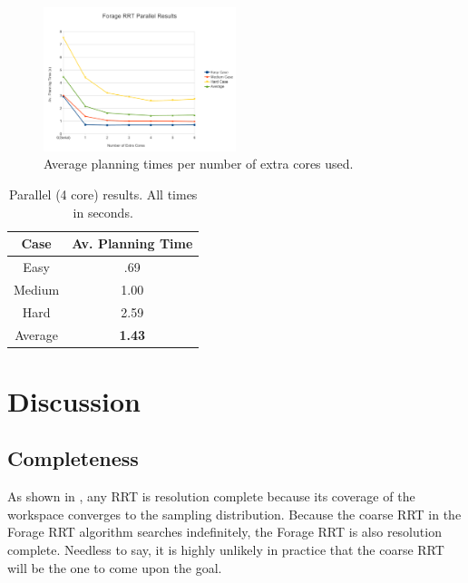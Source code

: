 \documentclass[conference]{IEEEtran}
\begin{document}
\begin{figure}[h!]
  \centering
    \includegraphics[width=0.5\textwidth]{figures/ParallelGraph.pdf}
  \caption{Average planning times per number of extra cores used. \label{fig:ParallelResults} }
\end{figure}

\begin{table}
        \centering
        \begin{tabular}{| c | c | }
                \hline
                Case & \textbf{Av. Planning Time} \\  \hline
                Easy & .69 \\  \hline
		Medium & 1.00 \\  \hline
		Hard & 2.59 \\  \hline
		Average &\textbf{1.43} \\  \hline
        \end{tabular}
        \caption{Parallel (4 core) results. All times in seconds.}
        \label{tab:BestParallel}
\end{table}



\section{Discussion}
\subsection{Completeness}
As shown in \cite{lavalle98}, any RRT is resolution complete because its coverage of the workspace converges to the sampling distribution.
Because the coarse RRT in the Forage RRT algorithm searches indefinitely, the Forage RRT is also resolution complete. Needless to say, it is
highly unlikely in practice that the coarse RRT will be the one to come upon the goal.
\end{document}
